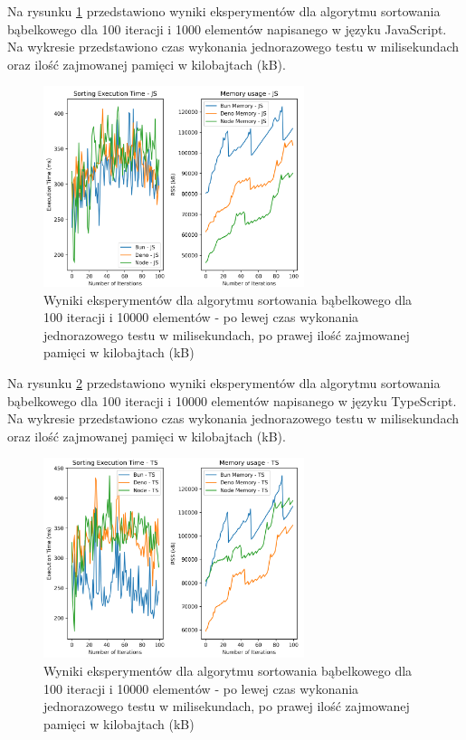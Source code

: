 Na rysunku \ref{fig:bubble_sorting_e2} przedstawiono wyniki eksperymentów dla algorytmu sortowania bąbelkowego dla 100 iteracji i 1000 elementów napisanego w języku JavaScript. Na wykresie przedstawiono czas wykonania jednorazowego testu w milisekundach oraz ilość zajmowanej pamięci w kilobajtach (kB).

\begin{figure}[H]
  \centering
  \includegraphics[width=0.68\textwidth]{Figures/sorting/sorting_bubble_100_10000_js.png}
  \caption{Wyniki eksperymentów dla algorytmu sortowania bąbelkowego dla 100 iteracji i 10000 elementów - po lewej czas wykonania jednorazowego testu w milisekundach, po prawej ilość zajmowanej pamięci w kilobajtach (kB)}
  \label{fig:bubble_sorting_e2}
\end{figure}

Na rysunku \ref{fig:bubble_sorting_e2_ts} przedstawiono wyniki eksperymentów dla algorytmu sortowania bąbelkowego dla 100 iteracji i 10000 elementów napisanego w języku TypeScript. Na wykresie przedstawiono czas wykonania jednorazowego testu w milisekundach oraz ilość zajmowanej pamięci w kilobajtach (kB).

\begin{figure}[H]
  \centering
  \includegraphics[width=0.68\textwidth]{Figures/sorting/sorting_bubble_100_10000_ts.png}
  \caption{Wyniki eksperymentów dla algorytmu sortowania bąbelkowego dla 100 iteracji i 10000 elementów - po lewej czas wykonania jednorazowego testu w milisekundach, po prawej ilość zajmowanej pamięci w kilobajtach (kB)}
  \label{fig:bubble_sorting_e2_ts}
\end{figure}

